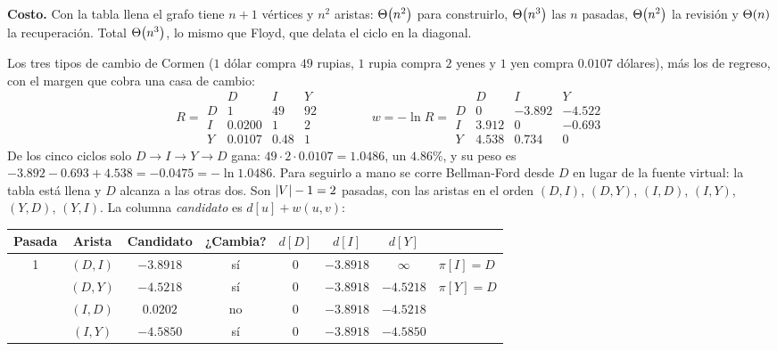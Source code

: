 \documentclass[11pt,letterpaper]{article}
\begin{document}
\textbf{Costo.} Con la tabla llena el grafo tiene $n + 1$ vértices y
$n^2$ aristas: $\Theta\!\left(n^2\right)$ para construirlo, $\Theta\!\left(n^3\right)$ las $n$
pasadas, $\Theta\!\left(n^2\right)$ la revisión y $\Theta\!\left(n\right)$ la recuperación. Total
$\Theta\!\left(n^3\right)$, lo mismo que Floyd, que delata el ciclo en la diagonal.

\begin{ejemplo}
  \label{ej:caminos-arbitraje}
  Los tres tipos de cambio de Cormen ($1$ dólar compra $49$ rupias,
  $1$ rupia compra $2$ yenes y $1$ yen compra $0.0107$ dólares), más
  los de regreso, con el margen que cobra una casa de cambio:
  \[
    R = \begin{array}{c|ccc}
          & D & I & Y \\ \hline
        D & 1 & 49 & 92 \\
        I & 0.0200 & 1 & 2 \\
        Y & 0.0107 & 0.48 & 1
      \end{array}
    \qquad\qquad
    w = -\ln R = \begin{array}{c|ccc}
          & D & I & Y \\ \hline
        D & 0 & -3.892 & -4.522 \\
        I & 3.912 & 0 & -0.693 \\
        Y & 4.538 & 0.734 & 0
      \end{array}
  \]
  De los cinco ciclos solo $D \to I \to Y \to D$ gana:
  $49 \cdot 2 \cdot 0.0107 = 1.0486$, un $4.86\%$, y su peso es
  $-3.892 - 0.693 + 4.538 = -0.0475 = -\ln 1.0486$. Para seguirlo a
  mano se corre Bellman-Ford desde $D$ en lugar de la fuente virtual:
  la tabla está llena y $D$ alcanza a las otras dos. Son
  $\left\lvert V \right\rvert - 1 = 2$ pasadas, con las aristas en el orden $(D, I)$,
  $(D, Y)$, $(I, D)$, $(I, Y)$, $(Y, D)$, $(Y, I)$. La columna
  \emph{candidato} es $d[u] + w(u, v)$:
  \begin{center}
  \small
  \begin{tabular}{cccccccl}
    \toprule
    \textbf{Pasada} & \textbf{Arista} & \textbf{Candidato}
      & \textbf{¿Cambia?} & $d[D]$ & $d[I]$ & $d[Y]$ & \\
    \midrule
    1 & $(D, I)$ & $-3.8918$ & sí & $0$ & $-3.8918$ & $\infty$
      & $\pi[I] = D$ \\
      & $(D, Y)$ & $-4.5218$ & sí & $0$ & $-3.8918$ & $-4.5218$
      & $\pi[Y] = D$ \\
      & $(I, D)$ & $0.0202$ & no & $0$ & $-3.8918$ & $-4.5218$ & \\
      & $(I, Y)$ & $-4.5850$ & sí & $0$ & $-3.8918$ & $-4.5850$

\end{tabular}
\end{center}
\end{ejemplo}
\end{document}
